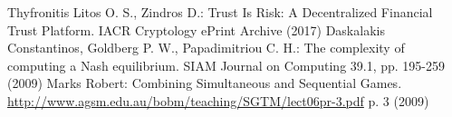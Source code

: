 \begin{thebibliography}{40}
  Thyfronitis Litos O. S., Zindros D.: Trust Is Risk: A Decentralized Financial Trust Platform. IACR Cryptology ePrint
  Archive (2017)
  Daskalakis Constantinos, Goldberg P. W., Papadimitriou C. H.: The complexity of computing a Nash equilibrium. SIAM Journal
  on Computing 39.1, pp. 195-259 (2009)
  Marks Robert: Combining Simultaneous and Sequential Games. \url{http://www.agsm.edu.au/bobm/teaching/SGTM/lect06pr-3.pdf} p.
  3 (2009)

\end{thebibliography}
